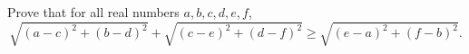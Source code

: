 Prove that for all real numbers $a,b,c,d,e,f$,
\[\sqrt{(a-c)^2+(b-d)^2}+\sqrt{(c-e)^2+(d-f)^2}\ge\sqrt{(e-a)^2+(f-b)^2}.\]
